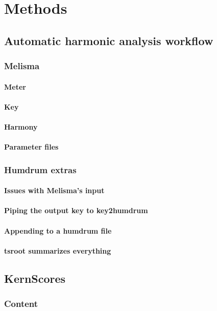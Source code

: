 \chapter{Methods}

\section{Automatic harmonic analysis workflow}
  \subsection{Melisma}
    \subsubsection{Meter}
    \subsubsection{Key}
    \subsubsection{Harmony}
    \subsubsection{Parameter files}
  \subsection{Humdrum extras}
    \subsubsection{Issues with Melisma's input}
    \subsubsection{Piping the output key to key2humdrum}
    \subsubsection{Appending to a humdrum file}
    \subsubsection{tsroot summarizes everything}
\section{KernScores}
  \subsection{Content}
